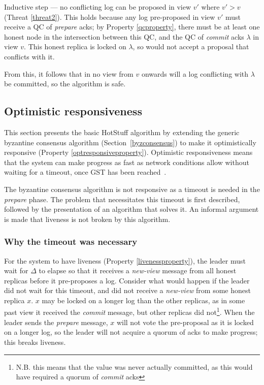 Inductive step --- no conflicting log can be proposed in view $v'$ where $v' > v$ (Threat \ref{threat2}). This holds because any log pre-proposed in view $v'$ must receive a QC of \textit{prepare} acks; by Property \ref{qcproperty}, there must be at least one honest node in the intersection between this QC, and the QC of \textit{commit} acks $\lambda$ in view $v$. This honest replica is locked on $\lambda$, so would not accept a proposal that conflicts with it.

From this, it follows that in no view from $v$ onwards will a log conflicting with $\lambda$ be committed, so the algorithm is safe.

\subsection{Optimistic responsiveness} \label{optresponsive}
This section presents the basic HotStuff algorithm by extending the generic byzantine consensus algorithm (Section~\ref{byzconsensus}) to make it optimistically responsive (Property \ref{optresponsiveproperty}). Optimistic responsiveness means that the system can make progress as fast as network conditions allow without waiting for a timeout, once GST has been reached~\cite{passThunderellaBlockchainsOptimistic2018}.

The byzantine consensus algorithm is not responsive as a timeout is needed in the \textit{prepare} phase. The problem that necessitates this timeout is first described, followed by the presentation of an algorithm that solves it. An informal argument is made that liveness is not broken by this algorithm.

\subsubsection{Why the timeout was necessary}
For the system to have liveness (Property \ref{livenessproperty}), the leader must wait for $\Delta$ to elapse so that it receives a \textit{new-view} message from all honest replicas before it pre-proposes a log. Consider what would happen if the leader did not wait for this timeout, and did not receive a \textit{new-view} from some honest replica $x$. $x$ may be locked on a longer log than the other replicas, as in some past view it received the \textit{commit} message, but other replicas did not\footnote{N.B. this means that the value was never actually committed, as this would have required a quorum of \textit{commit} acks}. When the leader sends the \textit{prepare} message, $x$ will not vote the pre-proposal as it is locked on a longer log, so the leader will not acquire a quorum of acks to make progress; this breaks liveness.

